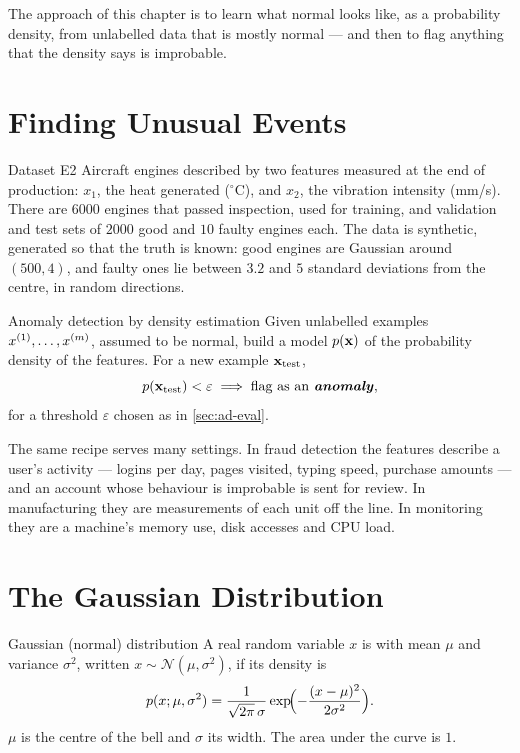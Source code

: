 The approach of this chapter is to learn what normal looks like, as a probability
density, from unlabelled data that is mostly normal --- and then to flag anything
that the density says is improbable.

\section{Finding Unusual Events}
\label{sec:unusual}

\begin{defbox}{Dataset E2}
Aircraft engines described by two features measured at the end of production:
$x_1$, the heat generated ($^\circ$C), and $x_2$, the vibration intensity
(mm/s). There are $6000$ engines that passed inspection, used for training, and
validation and test sets of $2000$ good and $10$ faulty engines each. The data is
synthetic, generated so that the truth is known: good engines are Gaussian
around $(500, 4)$, and faulty ones lie between $3.2$ and $5$ standard deviations
from the centre, in random directions.
\end{defbox}

\begin{defbox}{Anomaly detection by density estimation}
Given unlabelled examples $x^{(1)},\dots,x^{(m)}$, assumed to be normal, build a
model $p(\mathbf{x})$ of the probability density of the features. For a new example
$\mathbf{x}_{\text{test}}$,
\[
  p(\vx_{\text{test}}) < \varepsilon \;\Longrightarrow\; \text{flag as an
  \term{anomaly}},
\]
for a threshold $\varepsilon$ chosen as in \cref{sec:ad-eval}.
\end{defbox}

The same recipe serves many settings. In fraud detection the features describe a
user's activity --- logins per day, pages visited, typing speed, purchase
amounts --- and an account whose behaviour is improbable is sent for review. In
manufacturing they are measurements of each unit off the line. In monitoring
they are a machine's memory use, disk accesses and CPU load.

\section{The Gaussian Distribution}
\label{sec:gaussian}

\begin{defbox}{Gaussian (normal) distribution}
A real random variable $x$ is  with mean $\mu$ and variance
$\sigma^2$, written $x \sim \mathcal{N}(\mu, \sigma^2)$, if its density is
\[
  p(x;\mu,\sigma^2) = \frac{1}{\sqrt{2\pi}\,\sigma}
                      \exp\!\Bigl(-\frac{(x-\mu)^2}{2\sigma^2}\Bigr).
\]
$\mu$ is the centre of the bell and $\sigma$ its width. The area under the curve
is $1$.
\end{defbox}

